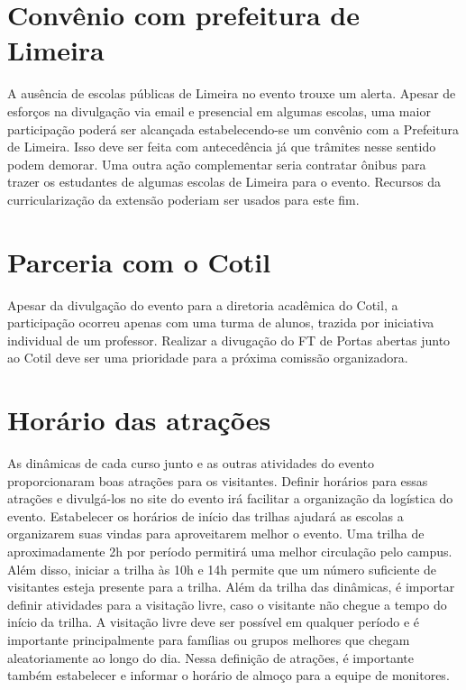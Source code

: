 \documentclass[
  letterpaper,
  DIV=11,
  numbers=noendperiod]{scrreprt}
\begin{document}
\section{Convênio com prefeitura de
Limeira}\label{convuxeanio-com-prefeitura-de-limeira}

A ausência de escolas públicas de Limeira no evento trouxe um alerta.
Apesar de esforços na divulgação via email e presencial em algumas
escolas, uma maior participação poderá ser alcançada estabelecendo-se um
convênio com a Prefeitura de Limeira. Isso deve ser feita com
antecedência já que trâmites nesse sentido podem demorar. Uma outra ação
complementar seria contratar ônibus para trazer os estudantes de algumas
escolas de Limeira para o evento. Recursos da curricularização da
extensão poderiam ser usados para este fim.

\section{Parceria com o Cotil}\label{parceria-com-o-cotil}

Apesar da divulgação do evento para a diretoria acadêmica do Cotil, a
participação ocorreu apenas com uma turma de alunos, trazida por
iniciativa individual de um professor. Realizar a divugação do FT de
Portas abertas junto ao Cotil deve ser uma prioridade para a próxima
comissão organizadora.

\section{Horário das atrações}\label{horuxe1rio-das-atrauxe7uxf5es}

As dinâmicas de cada curso junto e as outras atividades do evento
proporcionaram boas atrações para os visitantes. Definir horários para
essas atrações e divulgá-los no site do evento irá facilitar a
organização da logística do evento. Estabelecer os horários de início
das trilhas ajudará as escolas a organizarem suas vindas para
aproveitarem melhor o evento. Uma trilha de aproximadamente 2h por
período permitirá uma melhor circulação pelo campus. Além disso, iniciar
a trilha às 10h e 14h permite que um número suficiente de visitantes
esteja presente para a trilha. Além da trilha das dinâmicas, é importar
definir atividades para a visitação livre, caso o visitante não chegue a
tempo do início da trilha. A visitação livre deve ser possível em
qualquer período e é importante principalmente para famílias ou grupos
melhores que chegam aleatoriamente ao longo do dia. Nessa definição de
atrações, é importante também estabelecer e informar o horário de almoço
para a equipe de monitores.
\end{document}
